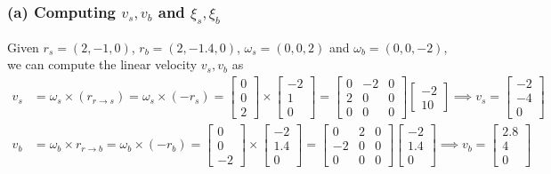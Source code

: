 \subsubsection*{(a) Computing \( v_{s}, v_{b} \) and \( \xi_{s}, \xi_{b} \)}

Given \( r_{s}=(2,-1,0) \), \( r_{b}=(2,-1.4,0) \), \( \omega_{s}=(0,0,2) \) and \( \omega_{b}=(0,0,-2) \), we can compute the linear velocity \( v_{s}, v_{b} \) as
\begin{align*}
    v_{s}
     & =
    \omega_{s} \times (r_{r \to s})
    =
    \omega_{s} \times (-r_{s})
    =
    \begin{bmatrix}
        0 \\
        0 \\
        2
    \end{bmatrix}
    \times
    \begin{bmatrix}
        -2 \\
        1  \\
        0
    \end{bmatrix}
    =
    \begin{bmatrix}
        0 & -2 & 0 \\
        2 & 0  & 0 \\
        0 & 0  & 0
    \end{bmatrix}
    \begin{bmatrix}
        -2 \\
        1
        0
    \end{bmatrix}
    \implies
    \boxed{
        v_{s}
        =
        \begin{bmatrix}
            -2 \\
            -4 \\
            0
        \end{bmatrix}
    }
    \\
    v_{b}
     & =
    \omega_{b} \times r_{r \to b}
    =
    \omega_{b} \times (-r_{b})
    =
    \begin{bmatrix}
        0 \\
        0 \\
        -2
    \end{bmatrix}
    \times
    \begin{bmatrix}
        -2  \\
        1.4 \\
        0
    \end{bmatrix}
    =
    \begin{bmatrix}
        0  & 2 & 0 \\
        -2 & 0 & 0 \\
        0  & 0 & 0
    \end{bmatrix}
    \begin{bmatrix}
        -2  \\
        1.4 \\
        0
    \end{bmatrix}
    \implies
    \boxed{
        v_{b}
        =
        \begin{bmatrix}
            2.8 \\
            4   \\
            0
        \end{bmatrix}
    }
\end{align*}
